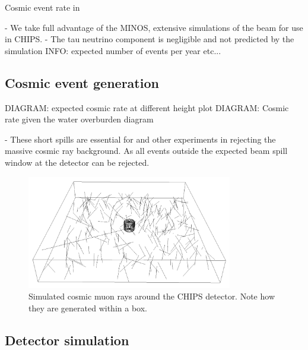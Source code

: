 Cosmic event rate in \cite{son2013}

- We take full advantage of the MINOS, \nova extensive simulations of the \numi beam for use in
CHIPS.
- The tau neutrino component is negligible and not predicted by the simulation
INFO: expected number of events per year etc...

\subsection{Cosmic event generation} %
\label{sec:chips_monte_carlo_cosmic} %

DIAGRAM: expected cosmic rate at different height plot
DIAGRAM: Cosmic rate given the water overburden diagram

- These short spills are essential for \chips and other experiments in rejecting the massive
cosmic ray background. As all events outside the expected beam spill window at the detector can be
rejected.

\begin{figure} %
    \includegraphics[width=0.8\textwidth]{diagrams/4-chips/cosmics.png}
    \caption[Cosmic muon rays around the CHIPS detector]
    {Simulated cosmic muon rays around the CHIPS detector. Note how they are generated within a
        box.}
    \label{fig:cosmics}
\end{figure}

\subsection{Detector simulation} %
\label{sec:chips_monte_carlo_sim} %

